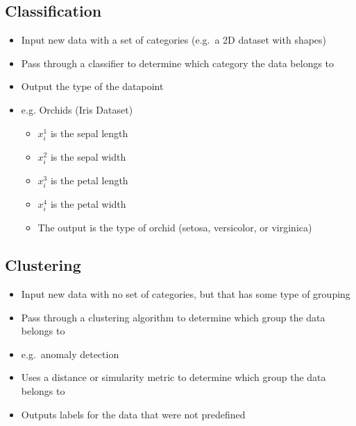 \documentclass[12pt]{article}
\begin{document}
        \subsection{Classification}
            \begin{itemize}
                \item Input new data with a set of categories (e.g.\ a 2D dataset with shapes)
                \item Pass through a classifier to determine which category the data belongs to
                \item Output the type of the datapoint
                \item e.g. Orchids (Iris Dataset)
                \begin{itemize}
                    \item $x_i^1$ is the sepal length
                    \item $x_i^2$ is the sepal width
                    \item $x_i^3$ is the petal length
                    \item $x_i^4$ is the petal width
                    \item The output is the type of orchid (setosa, versicolor, or virginica)
                \end{itemize}
            \end{itemize}
        \subsection{Clustering}
            \begin{itemize}
                \item Input new data with no set of categories, but that has some type of grouping
                \item Pass through a clustering algorithm to determine which group the data belongs to
                \item e.g.\ anomaly detection
                \item Uses a distance or simularity metric to determine which group the data belongs to
                \item Outputs labels for the data that were not predefined
            \end{itemize}
\end{document}
